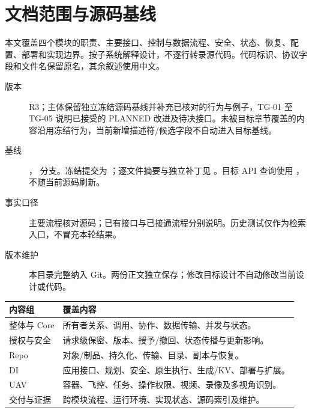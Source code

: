 \section{文档范围与源码基线}
本文覆盖四个模块的职责、主要接口、控制与数据流程、安全、状态、恢复、配置、部署和实现边界。按子系统解释设计，不逐行转录源代码。代码标识、协议字段和文件名保留原名，其余叙述使用中文。

\begin{description}
\item[版本] R3；主体保留独立冻结源码基线并补充已核对的行为与例子，TG-01 至 TG-05 说明已接受的 PLANNED 改进及待决接口。未被目标章节覆盖的内容沿用冻结行为，当前新增描述符/候选字段不自动进入目标基线。
\item[基线] \SnapshotDate， 分支。冻结提交为 \texttt{\SourceBaseline}；逐文件摘要与独立补丁见 。目标 API 查询使用 ，不随当前源码刷新。
\item[事实口径] 主要流程核对源码；已有接口与已接通流程分别说明。历史测试仅作为检索入口，不冒充本轮结果。
\item[版本维护] 本目录完整纳入 Git。两份正文独立保存；修改目标设计不自动修改当前设计或代码。
\end{description}

\begin{tabularx}{\linewidth}{@{}p{30mm}X@{}}
\toprule
内容组 & 覆盖内容 \\
\midrule
整体与 Core & 所有者关系、调用、协作、数据传输、并发与状态。\\
授权与安全 & 请求级保密、版本、授予/撤回、状态传播与更新影响。\\
Repo & 对象/制品、持久化、传输、目录、副本与恢复。\\
DI & 应用接口、规划、安全、原生执行、生成/KV、部署与扩展。\\
UAV & 容器、飞控、任务、操作权限、视频、录像及多视角识别。\\
交付与证据 & 跨模块流程、运行环境、实现状态、源码索引及维护。\\
\bottomrule
\end{tabularx}


\newpage

